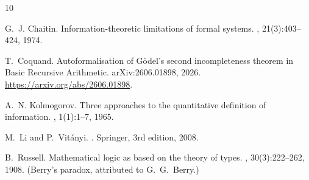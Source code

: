 \documentclass[11pt]{article}
\theoremstyle{plain}
\theoremstyle{definition}
\theoremstyle{remark}
\begin{document}
\begin{thebibliography}{10}

G.~J. Chaitin.
\newblock Information-theoretic limitations of formal systems.
, 21(3):403--424, 1974.

T.~Coquand.
\newblock Autoformalisation of G\"odel's second incompleteness theorem in
  Basic Recursive Arithmetic.
\newblock arXiv:2606.01898, 2026.
\newblock \url{https://arxiv.org/abs/2606.01898}.

A.~N. Kolmogorov.
\newblock Three approaches to the quantitative definition of information.
, 1(1):1--7, 1965.

M.~Li and P.~Vit\'anyi.
.
\newblock Springer, 3rd edition, 2008.

B.~Russell.
\newblock Mathematical logic as based on the theory of types.
, 30(3):222--262, 1908.
\newblock (Berry's paradox, attributed to G.~G.~Berry.)

\end{thebibliography}
\end{document}
